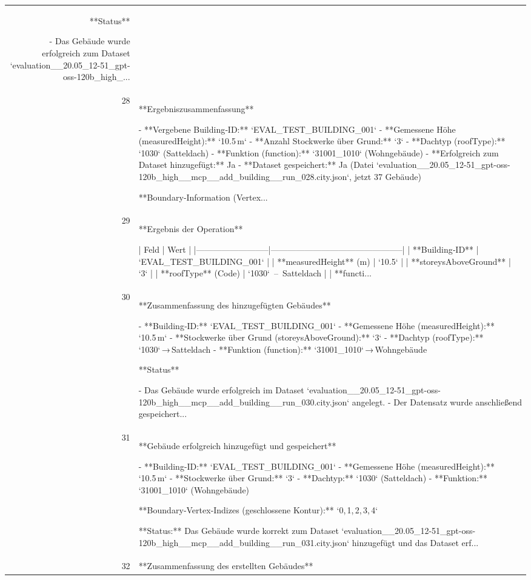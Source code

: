 \documentclass[a4paper,11pt]{article}
\begin{document}
\begin{table}[ht]
\begin{tabular}{r p{12cm}}
**Status**

- Das Gebäude wurde erfolgreich zum Dataset `evaluation\_\_20.05\_12-51\_gpt-oss-120b\_high\_... \\
28 & **Ergebniszusammenfassung**

- **Vergebene Building‑ID:** `EVAL\_TEST\_BUILDING\_001`  
- **Gemessene Höhe (measuredHeight):** `10.5 m`  
- **Anzahl Stockwerke über Grund:** `3`  
- **Dachtyp (roofType):** `1030` (Satteldach)  
- **Funktion (function):** `31001\_1010` (Wohngebäude)  
- **Erfolgreich zum Dataset hinzugefügt:** Ja  
- **Dataset gespeichert:** Ja (Datei `evaluation\_\_20.05\_12-51\_gpt-oss-120b\_high\_\_mcp\_\_add\_building\_\_run\_028.city.json`, jetzt 37 Gebäude)  

**Boundary‑Information (Vertex... \\
29 & **Ergebnis der Operation**

| Feld                     | Wert                                          |
|--------------------------|-----------------------------------------------|
| **Building‑ID**          | `EVAL\_TEST\_BUILDING\_001`                      |
| **measuredHeight** (m)   | `10.5`                                        |
| **storeysAboveGround**   | `3`                                           |
| **roofType** (Code)      | `1030`  –  Satteldach                         |
| **functi... \\
30 & **Zusammenfassung des hinzugefügten Gebäudes**

- **Building‑ID:** `EVAL\_TEST\_BUILDING\_001`  
- **Gemessene Höhe (measuredHeight):** `10.5 m`  
- **Stockwerke über Grund (storeysAboveGround):** `3`  
- **Dachtyp (roofType):** `1030` → Satteldach  
- **Funktion (function):** `31001\_1010` → Wohngebäude  

**Status**

- Das Gebäude wurde erfolgreich im Dataset `evaluation\_\_20.05\_12-51\_gpt-oss-120b\_high\_\_mcp\_\_add\_building\_\_run\_030.city.json` angelegt.  
- Der Datensatz wurde anschließend gespeichert... \\
31 & **Gebäude erfolgreich hinzugefügt und gespeichert**

- **Building-ID:** `EVAL\_TEST\_BUILDING\_001`  
- **Gemessene Höhe (measuredHeight):** `10.5 m`  
- **Stockwerke über Grund:** `3`  
- **Dachtyp:** `1030` (Satteldach)  
- **Funktion:** `31001\_1010` (Wohngebäude)  

**Boundary‑Vertex‑Indizes (geschlossene Kontur):** `0, 1, 2, 3, 4`  

**Status:** Das Gebäude wurde korrekt zum Dataset `evaluation\_\_20.05\_12-51\_gpt-oss-120b\_high\_\_mcp\_\_add\_building\_\_run\_031.city.json` hinzugefügt und das Dataset erf... \\
32 & **Zusammenfassung des erstellten Gebäudes**


\end{tabular}
\end{table}
\end{document}
